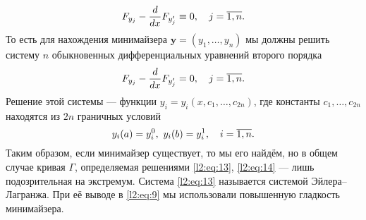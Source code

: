 \begin{equation}
	\label{l2:eq:12}
	\hfill F_{y_j}-\der{}{x}F_{y'_j}\equiv0,\quad j=\overline{1,n}.\hfill
\end{equation}
То есть для нахождения минимайзера $\bm{y}=(y_1,\ldots,y_n)$ мы должны решить систему $n$ обыкновенных дифференциальных уравнений второго порядка
\begin{equation}
	\label{l2:eq:13}
	\hfill F_{y_j}-\der{}{x}F_{y'_j}=0,\quad j=\overline{1,n}.\hfill
\end{equation}
Решение этой системы --- функции $y_i=y_i(x,c_1,\ldots,c_{2n})$, где константы $c_1,\ldots,c_{2n}$ находятся из $2n$ граничных условий
\begin{equation}
	\label{l2:eq:14}
	\hfill y_i(a)=y_i^0,\ y_i(b)=y_i^1,\quad i=\overline{1,n}.\hfill
\end{equation}
Таким образом, если минимайзер существует, то мы его найдём, но в общем случае кривая $\Gamma$, определяемая решениями \eqref{l2:eq:13}, \eqref{l2:eq:14} --- лишь подозрительная на экстремум. Система \eqref{l2:eq:13} называется системой Эйлера--Лагранжа. При её выводе в \eqref{l2:eq:9} мы использовали повышенную гладкость минимайзера.

